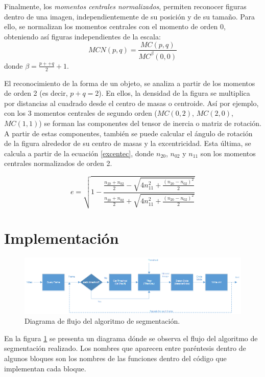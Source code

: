 Finalmente, los \textit{momentos centrales normalizados}, permiten reconocer figuras dentro de una imagen, independientemente de su posición y de su tamaño. Para ello, se normalizan los momentos centrales con el momento de orden $0$, obteniendo así figuras independientes de la escala: $$MCN(p,q) = \frac{MC(p,q)}{MC^{\beta}(0,0)}$$ donde ${\beta}=\frac{p++q}{2}+1$.

El reconocimiento de la forma de un objeto, se analiza a partir de los momentos de orden 2 (es decir, $p+q=2$). En ellos, la densidad de la figura se multiplica por distancias al cuadrado desde el centro de masas o centroide. Así por ejemplo, con los 3 momentos centrales de segundo orden ($MC(0,2)$, $MC(2,0)$, $MC(1,1)$) se forman las componentes del tensor de inercia o matriz de rotación. A partir de estas componentes, también se puede calcular el ángulo de rotación de la figura alrededor de su centro de masas y la excentricidad. Esta última, se calcula a partir de la ecuación \ref{excentec}, donde $n_{20}$, $n_{02}$ y $n_{11}$ son los momentos centrales normalizados de orden 2.

\begin{equation}
e = \sqrt{1-\frac{\frac{n_{20}+n_{02}}{2}-\sqrt{4n_{11}^2+\frac{(n_{20}-n_{02})^2}{2}}}{\frac{n_{20}+n_{02}}{2}+\sqrt{4n_{11}^2+\frac{(n_{20}-n_{02})^2}{2}}}}
\label{excentec}
\end{equation}

\section{Implementación}
\label{implementSegment}

\begin{figure}[H]
\hspace{-1.5cm}
\includegraphics[scale=0.7]{img/diagrama_segmentacion.png}
\caption{Diagrama de flujo del algoritmo de segmentación.}
\label{diagramaSegmentacion}
\end{figure}

En la figura \ref{diagramaSegmentacion} se presenta un diagrama dónde se observa el flujo del algoritmo de segmentación realizado. Los nombres que aparecen entre paréntesis dentro de algunos bloques son los nombres de las funciones dentro del código que implementan cada bloque. 

